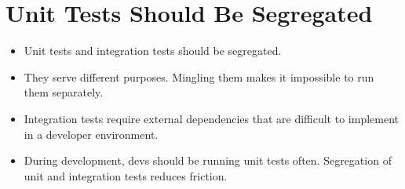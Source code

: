 \documentclass{article}
\begin{document}
\sloppy
\section{Unit Tests Should Be Segregated}
\begin{itemize}
    \item Unit tests and integration tests should be segregated.
    \item They serve different purposes. Mingling them makes it impossible to
        run them separately.
    \item Integration tests require external dependencies that are difficult to
        implement in a developer environment.
    \item During development, devs should be running unit tests often. Segregation
        of unit and integration tests reduces friction.
\end{itemize}
\end{document}
